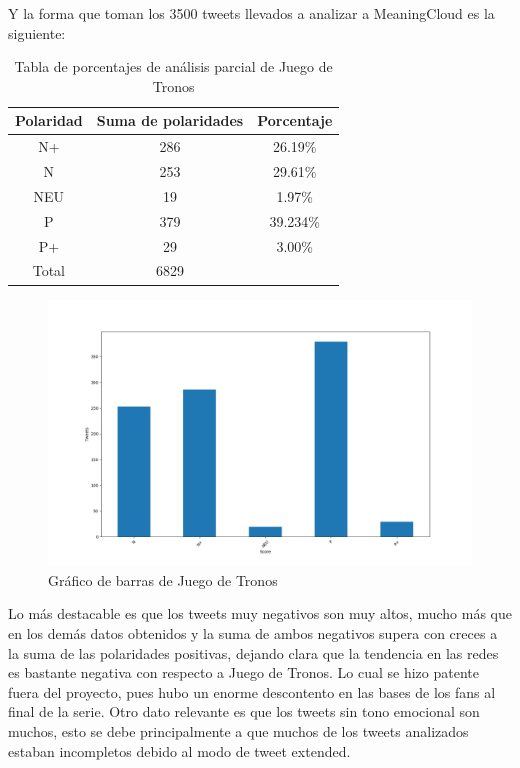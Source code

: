 Y la forma que toman los 3500 tweets llevados a analizar a MeaningCloud es la siguiente:


\begin{table}[H]
	\centering
	\begin{tabular}{|c|c|c|}
		\hline 
		Polaridad& Suma de polaridades & Porcentaje \\ 
		\hline 
		N+& 286 & 26.19\% \\ 
		\hline 
		N& 253 &  29.61\%\\ 
		\hline 
		NEU& 19 & 1.97\% \\ 
		\hline 
		P& 379 & 39.234\% \\ 
		\hline 
		P+& 29 & 3.00\% \\ 
		\hline 
		Total & 6829 & \\
		\hline
	\end{tabular} 
	\caption{Tabla de porcentajes de análisis parcial de Juego de Tronos}
	\label{tbl:porcentaje-JdT}
\end{table}

\begin{figure}[H]
	\centering
	
		\includegraphics[scale=.3]{imagenes/barraJdt.png}
		
		\caption{Gráfico de barras de Juego de Tronos} 
		

	\label{fig:JdT}
\end{figure}

Lo más destacable es que los tweets muy negativos son muy altos, mucho más que en los demás datos obtenidos y la suma de ambos negativos supera con creces a la suma de las polaridades positivas, dejando clara que la tendencia en las redes es bastante negativa con respecto a Juego de Tronos. Lo cual se hizo patente fuera del proyecto, pues hubo un enorme descontento en las bases de los fans al final de la serie. Otro dato relevante es que los tweets sin tono emocional son muchos, esto se debe principalmente a que muchos de los tweets analizados estaban incompletos debido al modo de tweet extended. 
